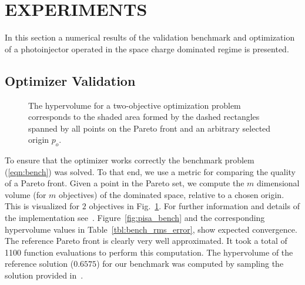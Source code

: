 \section{EXPERIMENTS} \label{sec:experiments}

In this section a numerical results of the validation benchmark and
  optimization of a photoinjector operated in the space charge dominated regime is presented.

\subsection{Optimizer Validation}

\begin{figure}
    \centering
    \begin{tikzpicture}[text=black]
      
    \end{tikzpicture}
  \caption{The hypervolume for a two-objective optimization problem
  corresponds to the shaded area formed by the dashed rectangles spanned by
  all points on the Pareto front and an arbitrary selected origin $p_o$.}
  \label{fig:hypervolume}
\end{figure}

To ensure that the optimizer works correctly the benchmark
  problem (\ref{eqn:bench}) was solved.
To that end, we use a metric for comparing the quality of a Pareto
  front.
Given a point in the Pareto set, we compute the $m$ dimensional volume (for
  $m$ objectives) of the dominated space, relative to a chosen origin.
This is visualized for $2$ objectives in Fig.~\ref{fig:hypervolume}.
For further information and details of the implementation see~\cite{whbb:12}.
Figure~\ref{fig:pisa_bench} and the corresponding hypervolume values in
  Table~\ref{tbl:bench_rms_error}, show expected convergence.
The reference Pareto front is clearly very well approximated.
It took a total of 1100 function evaluations to perform this computation.
The hypervolume of the reference solution ($0.6575$) for our benchmark was
  computed by sampling the solution provided in~\cite{hbwh:05}.

